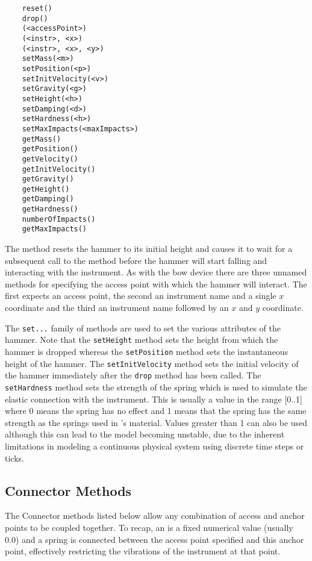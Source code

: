 \begin{verbatim}
    reset()
    drop()
    (<accessPoint>)
    (<instr>, <x>)
    (<instr>, <x>, <y>)
    setMass(<m>)
    setPosition(<p>)
    setInitVelocity(<v>)
    setGravity(<g>)
    setHeight(<h>)
    setDamping(<d>)
    setHardness(<h>)
    setMaxImpacts(<maxImpacts>)
    getMass()
    getPosition()
    getVelocity()
    getInitVelocity()
    getGravity()
    getHeight()
    getDamping()
    getHardness()
    numberOfImpacts()
    getMaxImpacts()
\end{verbatim}

The  method resets the hammer to its initial height and
causes it to wait for a subsequent call to the  method
before the hammer will start falling and interacting with the instrument.
As with the bow device there are three unnamed methods for specifying
the access point with which the hammer will interact. The first expects
an access point, the second an instrument name and a single $x$ coordinate
and the third an instrument name followed by an $x$ and $y$ coordinate.

The \verb|set...| family of methods are used to set the various attributes
of the hammer. Note that the \verb|setHeight| method sets the height from
which the hammer is dropped whereas the \verb|setPosition| method sets
the instantaneous height of the hammer. The \verb|setInitVelocity| method
sets the initial velocity of the hammer immediately after the \verb|drop|
method has been called. The \verb|setHardness| method sets the strength
of the spring which is used to simulate the elastic connection with the
instrument. This is usually a value in the range [0..1] where 0 means
the spring has no effect and 1 means that the spring has the same strength
as the springs used in \tao's material. Values greater than 1 can also
be used although this can lead to the model becoming unstable, due to
the inherent limitations in modeling a continuous physical system using
discrete time steps or ticks. 

\subsection{Connector Methods}
The Connector methods listed below allow any combination of access
and anchor points to be coupled together. To recap, an 
is a fixed numerical value (usually 0.0) and a spring is connected
between the access point specified and this anchor point, effectively
restricting the vibrations of the instrument at that point.

